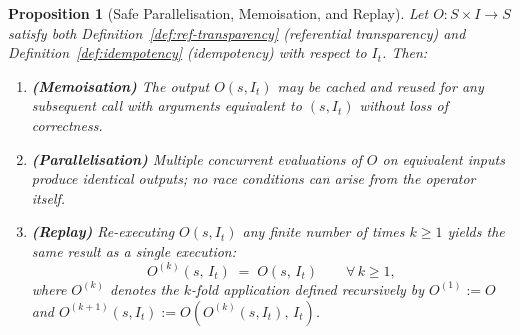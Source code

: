 \documentclass[12pt,openany]{book}
\newcommand{\calI}{\mathcal{I}}
\numberwithin{equation}{chapter}
\theoremstyle{plain}
\newtheorem{proposition}[theorem]{Proposition}
\theoremstyle{definition}
\theoremstyle{remark}
\numberwithin{equation}{chapter}
\theoremstyle{plain}
\newcommand{\calS}{\mathcal{S}}
\def\calI{I}%
\def\calS{S}%
\begin{document}
\begin{proposition}[Safe Parallelisation, Memoisation, and Replay]
\label{prop:safe-parallel}
Let $O : \calS \times \calI \to \calS$ satisfy both
Definition~\ref{def:ref-transparency} (referential transparency) and
Definition~\ref{def:idempotency} (idempotency) with respect to
$\calI_t$.  Then:
\begin{enumerate}
  \item \textbf{(Memoisation)}
        The output $O(s, \calI_t)$ may be cached and reused for any
        subsequent call with arguments equivalent to $(s, \calI_t)$
        without loss of correctness.

  \item \textbf{(Parallelisation)}
        Multiple concurrent evaluations of $O$ on equivalent inputs
        produce identical outputs; no race conditions can arise from
        the operator itself.

  \item \textbf{(Replay)}
        Re-executing $O(s, \calI_t)$ any finite number of times $k
        \geq 1$ yields the same result as a single execution:
        \begin{equation}
          O^{(k)}(s,\, \calI_t) \;=\; O(s,\, \calI_t)
          \qquad \forall\, k \geq 1,
          \label{eq:replay}
        \end{equation}
        where $O^{(k)}$ denotes the $k$-fold application defined
        recursively by $O^{(1)} := O$ and
        $O^{(k+1)}(s, \calI_t) := O(O^{(k)}(s, \calI_t),\, \calI_t)$.
\end{enumerate}
\end{proposition}
\end{document}
